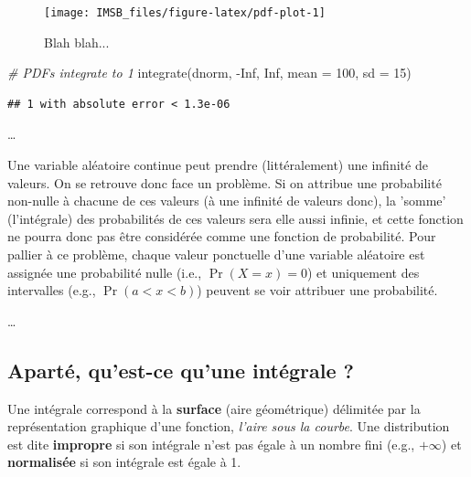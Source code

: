 \documentclass[
  a4paper,11pt,twoside,onecolumn,openright,final,oldfontcommands]{memoir}
\newenvironment{Shaded}{\begin{snugshade}}{\end{snugshade}}
\newcommand{\AttributeTok}[1]{\textcolor[rgb]{0.77,0.63,0.00}{#1}}
\newcommand{\CommentTok}[1]{\textcolor[rgb]{0.56,0.35,0.01}{\textit{#1}}}
\newcommand{\ConstantTok}[1]{\textcolor[rgb]{0.00,0.00,0.00}{#1}}
\newcommand{\DecValTok}[1]{\textcolor[rgb]{0.00,0.00,0.81}{#1}}
\newcommand{\FunctionTok}[1]{\textcolor[rgb]{0.00,0.00,0.00}{#1}}
\newcommand{\NormalTok}[1]{#1}
\newcommand{\SpecialCharTok}[1]{\textcolor[rgb]{0.00,0.00,0.00}{#1}}
\theoremstyle{definition}
\theoremstyle{definition}
\theoremstyle{definition}
\theoremstyle{definition}
\theoremstyle{remark}
\begin{document}
\begin{figure}[!htb]

{\centering \texttt{[image: IMSB\_files/figure-latex/pdf-plot-1]} 

}

\caption{Blah blah...}\label{fig:pdf-plot}
\end{figure}

\begin{Shaded}
\begin{Highlighting}[]
\CommentTok{\# PDFs integrate to 1}
\FunctionTok{integrate}\NormalTok{(dnorm, }\SpecialCharTok{{-}}\ConstantTok{Inf}\NormalTok{, }\ConstantTok{Inf}\NormalTok{, }\AttributeTok{mean =} \DecValTok{100}\NormalTok{, }\AttributeTok{sd =} \DecValTok{15}\NormalTok{)}
\end{Highlighting}
\end{Shaded}

\begin{verbatim}
## 1 with absolute error < 1.3e-06
\end{verbatim}

\ldots{}

\begin{keyconcepts}{1.1}
Une variable aléatoire continue peut prendre (littéralement) une infinité de valeurs. On se retrouve donc face un problème. Si on attribue une probabilité non-nulle à chacune de ces valeurs (à une infinité de valeurs donc), la 'somme' (l'intégrale) des probabilités de ces valeurs sera elle aussi infinie, et cette fonction ne pourra donc pas être considérée comme une fonction de probabilité. Pour pallier à ce problème, chaque valeur ponctuelle d'une variable aléatoire est assignée une probabilité nulle (i.e., $\Pr(X = x) = 0$) et uniquement des intervalles (e.g., $\Pr(a < x < b)$) peuvent se voir attribuer une probabilité.
\end{keyconcepts}

\ldots{}

\hypertarget{apartuxe9-quest-ce-quune-intuxe9grale}{%
\subsection{Aparté, qu'est-ce qu'une intégrale ?}\label{apartuxe9-quest-ce-quune-intuxe9grale}}

Une intégrale correspond à la \textbf{surface} (aire géométrique) délimitée par la représentation graphique d'une fonction, \emph{l'aire sous la courbe}. Une distribution est dite \textbf{impropre} si son intégrale n'est pas égale à un nombre fini (e.g., \(+ \infty\)) et \textbf{normalisée} si son intégrale est égale à 1.
\end{document}

